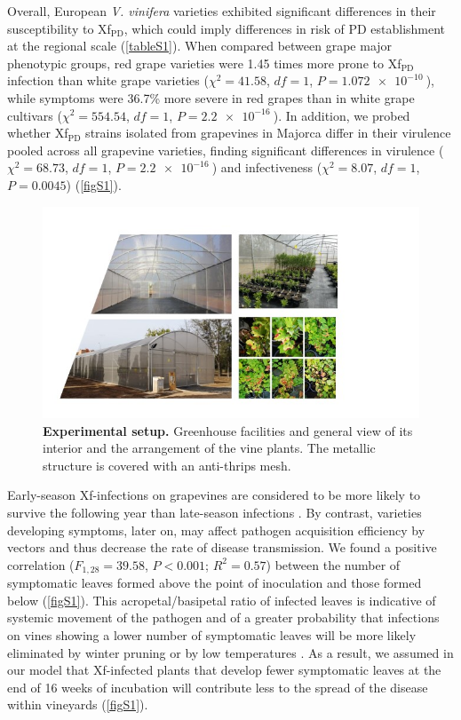 Overall, European \textit{V. vinifera} varieties exhibited significant
differences in their susceptibility to Xf$_{\textrm{PD}}$, which could imply
differences in risk of PD establishment at the regional scale (\cref{tableS1}).
When compared between grape major phenotypic groups, red grape varieties were
1.45 times more prone to Xf$_{\textrm{PD}}$ infection than white grape
varieties ($\chi^2= 41.58$, $df=1$, $P=\SI{1.072e-10}{}$), while symptoms were
36.7\% more severe in red grapes than in white grape cultivars
($\chi^2=554.54$, $df=1$, $P=\SI{2.2e-16}{}$).	In addition, we probed whether
Xf$_{\textrm{PD}}$ strains isolated from grapevines in Majorca differ in their
virulence pooled across all grapevine varieties, finding significant
differences in virulence ($\chi^2 = 68.73$, $df = 1$, $P = \SI{2.2e-16}{}$) and
infectiveness ($\chi^2 = 8.07$, $df = 1$, $P =0.0045$) (\cref{figS1}).

\begin{figure}[H]
    \centering
    \includegraphics[width=\textwidth]{Figures/Experimental setup.jpg}
    \caption[Experimental setup]{\textbf{Experimental setup.} Greenhouse
        facilities and general
        view of its interior and the arrangement of the vine plants. The
        metallic
        structure is covered with an anti-thrips mesh.}
    \label{fig:experimental_setup} %
\end{figure}

Early-season Xf-infections on grapevines are considered to be more likely to
survive the following year than late-season infections
\cite{Feil2001,Lieth2011}. By contrast, varieties developing symptoms, later
on, may affect pathogen acquisition efficiency by vectors and thus decrease the
rate of disease transmission. We found a positive correlation ($F_{1,28} =
    39.58$, $P < 0.001$; $R^2= 0.57$) between the number of symptomatic leaves
formed above the point of inoculation and those formed below (\cref{figS1}).
This acropetal/basipetal ratio of infected leaves is indicative of systemic
movement of the pathogen and of a greater probability that infections on vines
showing a lower number of symptomatic leaves will be more likely eliminated by
winter pruning or by low temperatures \cite{Daugherty2018}. As a result, we
assumed in our model that Xf-infected plants that develop fewer symptomatic
leaves at the end of 16 weeks of incubation will contribute less to the spread
of the disease within vineyards (\cref{figS1}).

